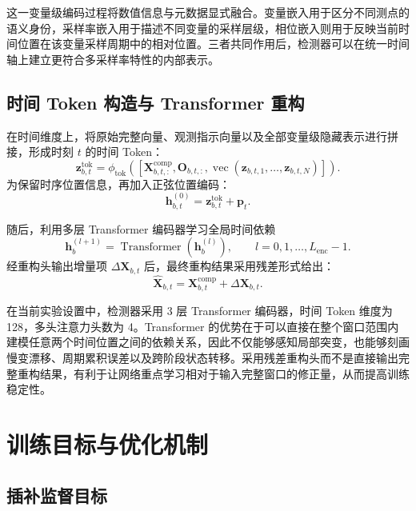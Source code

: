 这一变量级编码过程将数值信息与元数据显式融合。变量嵌入用于区分不同测点的语义身份，采样率嵌入用于描述不同变量的采样层级，相位嵌入则用于反映当前时间位置在该变量采样周期中的相对位置。三者共同作用后，检测器可以在统一时间轴上建立更符合多采样率特性的内部表示。

\subsection{时间 Token 构造与 Transformer 重构}

在时间维度上，将原始完整向量、观测指示向量以及全部变量级隐藏表示进行拼接，形成时刻 $t$ 的时间 Token：
\begin{equation}
    \mathbf{z}_{b,t}^{\mathrm{tok}}
    =
    \phi_{\mathrm{tok}}
    \left(
        \left[
            \mathbf{X}_{b,t,:}^{\mathrm{comp}},
            \mathbf{O}_{b,t,:},
            \operatorname{vec}(\mathbf{z}_{b,t,1},\ldots,\mathbf{z}_{b,t,N})
        \right]
    \right).
\end{equation}
为保留时序位置信息，再加入正弦位置编码：
\begin{equation}
    \mathbf{h}_{b,t}^{(0)} = \mathbf{z}_{b,t}^{\mathrm{tok}} + \mathbf{p}_t.
\end{equation}

随后，利用多层 Transformer 编码器学习全局时间依赖
\begin{equation}
    \mathbf{h}_{b}^{(l+1)} = \operatorname{Transformer}\!\left(\mathbf{h}_{b}^{(l)}\right), \qquad l=0,1,\ldots,L_{\mathrm{enc}}-1.
\end{equation}
经重构头输出增量项 $\Delta \mathbf{X}_{b,t}$ 后，最终重构结果采用残差形式给出：
\begin{equation}
    \hat{\mathbf{X}}_{b,t} = \mathbf{X}_{b,t}^{\mathrm{comp}} + \Delta \mathbf{X}_{b,t}.
\end{equation}

在当前实验设置中，检测器采用 3 层 Transformer 编码器，时间 Token 维度为 128，多头注意力头数为 4。Transformer 的优势在于可以直接在整个窗口范围内建模任意两个时间位置之间的依赖关系，因此不仅能够感知局部突变，也能够刻画慢变漂移、周期累积误差以及跨阶段状态转移。采用残差重构头而不是直接输出完整重构结果，有利于让网络重点学习相对于输入完整窗口的修正量，从而提高训练稳定性。

\section{训练目标与优化机制}

\subsection{插补监督目标}


